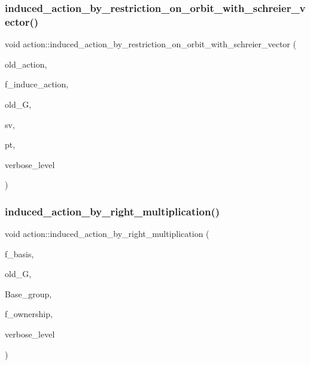 \subsubsection{\texorpdfstring{induced\+\_\+action\+\_\+by\+\_\+restriction\+\_\+on\+\_\+orbit\+\_\+with\+\_\+schreier\+\_\+vector()}{induced\_action\_by\_restriction\_on\_orbit\_with\_schreier\_vector()}}
{\footnotesize\ttfamily void action\+::induced\+\_\+action\+\_\+by\+\_\+restriction\+\_\+on\+\_\+orbit\+\_\+with\+\_\+schreier\+\_\+vector (\begin{DoxyParamCaption}\item[{\mbox{\hyperlink{classaction}{action}} \&}]{old\+\_\+action,  }\item[{\mbox{\hyperlink{galois_8h_a09fddde158a3a20bd2dcadb609de11dc}{I\+NT}}}]{f\+\_\+induce\+\_\+action,  }\item[{\mbox{\hyperlink{classsims}{sims}} $\ast$}]{old\+\_\+G,  }\item[{\mbox{\hyperlink{galois_8h_a09fddde158a3a20bd2dcadb609de11dc}{I\+NT}} $\ast$}]{sv,  }\item[{\mbox{\hyperlink{galois_8h_a09fddde158a3a20bd2dcadb609de11dc}{I\+NT}}}]{pt,  }\item[{\mbox{\hyperlink{galois_8h_a09fddde158a3a20bd2dcadb609de11dc}{I\+NT}}}]{verbose\+\_\+level }\end{DoxyParamCaption})}

\mbox{\label{classaction_aafa2818d9d98046507e2754938be0c04}} 
\subsubsection{\texorpdfstring{induced\+\_\+action\+\_\+by\+\_\+right\+\_\+multiplication()}{induced\_action\_by\_right\_multiplication()}}
{\footnotesize\ttfamily void action\+::induced\+\_\+action\+\_\+by\+\_\+right\+\_\+multiplication (\begin{DoxyParamCaption}\item[{\mbox{\hyperlink{galois_8h_a09fddde158a3a20bd2dcadb609de11dc}{I\+NT}}}]{f\+\_\+basis,  }\item[{\mbox{\hyperlink{classsims}{sims}} $\ast$}]{old\+\_\+G,  }\item[{\mbox{\hyperlink{classsims}{sims}} $\ast$}]{Base\+\_\+group,  }\item[{\mbox{\hyperlink{galois_8h_a09fddde158a3a20bd2dcadb609de11dc}{I\+NT}}}]{f\+\_\+ownership,  }\item[{\mbox{\hyperlink{galois_8h_a09fddde158a3a20bd2dcadb609de11dc}{I\+NT}}}]{verbose\+\_\+level }\end{DoxyParamCaption})}

